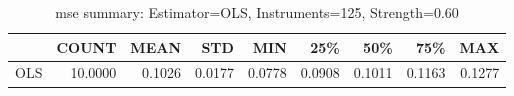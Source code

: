 \begin{table}[ht]
\centering
\caption{mse summary: Estimator=OLS, Instruments=125, Strength=0.60}
\begin{tabular}{lrrrrrrrr}
\toprule
 & COUNT & MEAN & STD & MIN & 25\% & 50\% & 75\% & MAX \\
\midrule
OLS & 10.0000 & 0.1026 & 0.0177 & 0.0778 & 0.0908 & 0.1011 & 0.1163 & 0.1277 \\
\bottomrule
\end{tabular}
\end{table}
